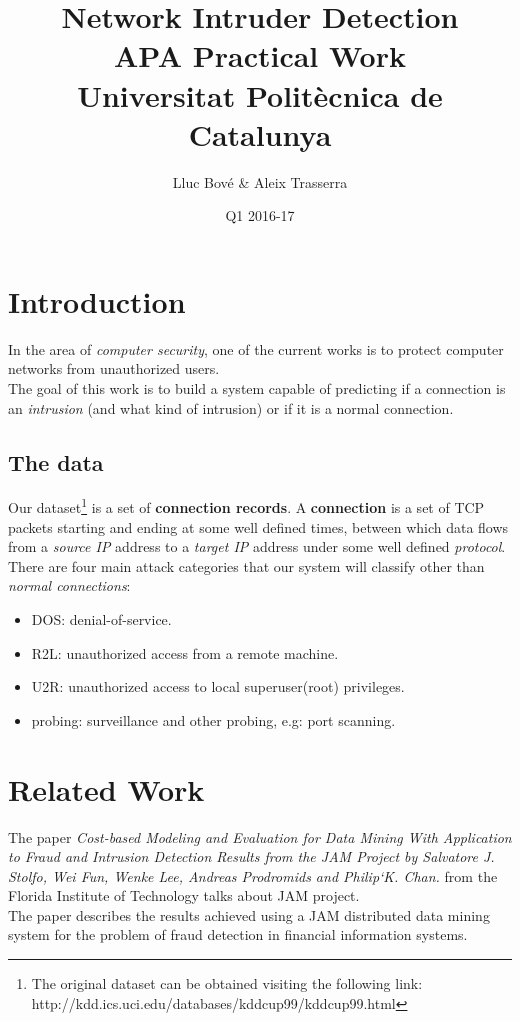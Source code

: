 \documentclass[a4paper]{article} %
\title{Network Intruder Detection \\
\large APA Practical Work \\
Universitat Politècnica de Catalunya} %
\author{Lluc Bové \& Aleix Trasserra} %
\date{Q1 2016-17}
\begin{document}
\maketitle %



\section{Introduction}
In the area of \textit{computer security}, one of the current works is to protect computer networks from unauthorized users. \\
The goal of this work is to build a system capable of predicting if a connection is an \textit{intrusion} (and what kind of intrusion) or if it is a normal connection. 
 
\subsection{The data}
Our dataset\footnote{The original dataset can be obtained visiting the following link:\\  http://kdd.ics.uci.edu/databases/kddcup99/kddcup99.html} is a set of \textbf{connection records}.
A \textbf{connection} is a set of TCP packets starting and ending at some well defined times, between which data flows from a \textit{source IP} address to a \textit{target IP} address under some well defined \textit{protocol}.
There are four main attack categories that our system will classify other than \textit{normal connections}:
\begin{itemize}
	\item DOS: denial-of-service.
	\item R2L: unauthorized access from a remote machine.
	\item U2R: unauthorized access to local superuser(root) privileges.
	\item probing: surveillance and other probing, e.g: port scanning.
\end{itemize}



\section{Related Work}
The paper \textit{Cost-based Modeling and Evaluation for Data Mining With Application to Fraud and Intrusion Detection Results from the JAM Project by Salvatore J. Stolfo, Wei Fun, Wenke Lee, Andreas Prodromids and Philip`K. Chan.} from the Florida Institute of Technology talks about JAM project. \\
The paper describes the results achieved using a JAM distributed data mining system for the problem of fraud detection in financial information systems. \\
\end{document}
